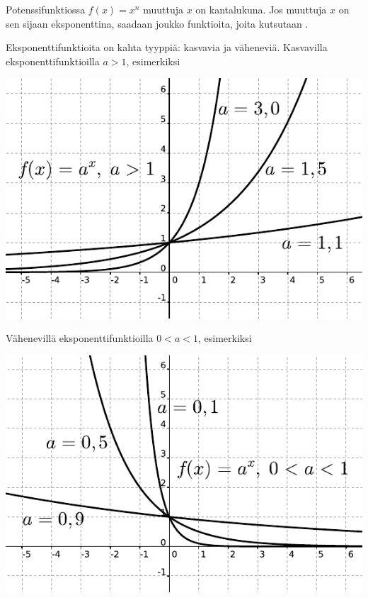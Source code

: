 Potenssifunktiossa $f(x) = x^n$ muuttuja $x$ on kantalukuna. Jos muuttuja
$x$ on sen sijaan eksponenttina, saadaan joukko funktioita, joita
kutsutaan .


Eksponenttifunktioita on kahta tyyppiä: kasvavia ja väheneviä.
Kasvavilla eksponenttifunktioilla $a>1$, esimerkiksi

\begin{center}
\includegraphics{pictures/apotenssiinxaisompikuinyksi.pdf}
\end{center}

Vähenevillä eksponenttifunktioilla $0<a<1$, esimerkiksi

\begin{center}
\includegraphics{pictures/apotenssiinxaisompikuinnolla.pdf}
\end{center}

